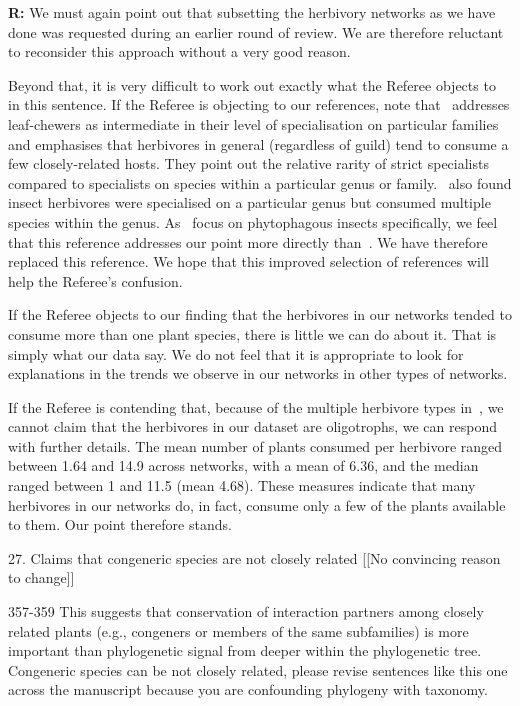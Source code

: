 \documentclass[12pt]{letter}
\newenvironment{refquote}{\bigskip \begin{it}}{\end{it}\smallskip}
\begin{document}
		\textbf{R:} We must again point out that subsetting the herbivory networks as we have done was requested during an earlier round of review. We are therefore reluctant to reconsider this approach without a very good reason. 


		Beyond that, it is very difficult to work out exactly what the Referee objects to in this sentence. If the Referee is objecting to our references, note that~\citet{Novotny2005} addresses leaf-chewers as intermediate in their level of specialisation on particular families and emphasises that herbivores in general (regardless of guild) tend to consume a few closely-related hosts. They point out the relative rarity of strict specialists compared to specialists on species within a particular genus or family.~\citet{Brandle2006} also found insect herbivores were specialised on a particular genus but consumed multiple species within the genus. As~\citet{Brandle2006} focus on phytophagous insects specifically, we feel that this reference addresses our point more directly than~\citet{Yguel2011}. We have therefore replaced this reference. We hope that this improved selection of references will help the Referee's confusion.


		If the Referee objects to our finding that the herbivores in our networks tended to consume more than one plant species, there is little we can do about it. That is simply what our data say. We do not feel that it is appropriate to look for explanations in the trends we observe in our networks in other types of networks. 


		If the Referee is contending that, because of the multiple herbivore types in~\citet{Novotny2005}, we cannot claim that the herbivores in our dataset are oligotrophs, we can respond with further details. The mean number of plants consumed per herbivore ranged between 1.64 and 14.9 across networks, with a mean of 6.36, and the median ranged between 1 and 11.5 (mean 4.68). These measures indicate that many herbivores in our networks do, in fact, consume only a few of the plants available to them. Our point therefore stands.


	27. Claims that congeneric species are not closely related [[No convincing reason to change]]

		\begin{refquote}
			357-359 This suggests that conservation of interaction partners among closely related plants (e.g., congeners or members of the same subfamilies) is more important than phylogenetic signal from deeper within the phylogenetic tree. Congeneric species can be not closely related, please revise sentences like this one across the manuscript because you are confounding phylogeny with taxonomy.
		\end{refquote}
\end{document}
